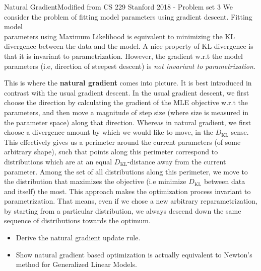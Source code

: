 \begin{problem}{Natural Gradient}{}{Modified from CS 229 Stanford 2018 - Problem set 3}
We consider the problem of fitting model parameters using gradient descent. Fitting model \\
parameters using Maximum Likelihood is equivalent to minimizing the KL divergence between the data and the model.
A nice property of KL divergence is that it is invariant to parametrization.
However, the gradient w.r.t the model parameters (i.e, direction of steepest descent)
is \emph{not invariant to parametrization}.

This is where the \textbf{natural gradient} comes into picture. It is best introduced in contrast with the
usual gradient descent. In the usual gradient descent, we first choose the direction by calculating
the gradient of the MLE objective w.r.t the parameters, and then move a magnitude of step size
(where size is measured in the parameter space) along that direction. Whereas in natural gradient,
we first choose a divergence amount by which we would like to move, in the \(D_{\mathrm{KL}} \) sense. This
eﬀectively gives us a perimeter around the current parameters (of some arbitrary shape), such
that points along this perimeter correspond to distributions which are at an equal \(D_{\mathrm{KL}} \)-distance
away from the current parameter. Among the set of all distributions along this perimeter, we
move to the distribution that maximizes the objective (i.e minimize \(D_{\mathrm{KL}} \) between data and
itself) the most. This approach makes the optimization process invariant to parametrization.
That means, even if we chose a new arbitrary reparametrization, by starting from a particular
distribution, we always descend down the same sequence of distributions towards the optimum.
\begin{itemize}
    \item[(a)] Derive the natural gradient update rule.
    \item[(b)] Show natural gradient based optimization is actually equivalent to
          Newton’s method for Generalized Linear Models.
\end{itemize}

\end{problem}

